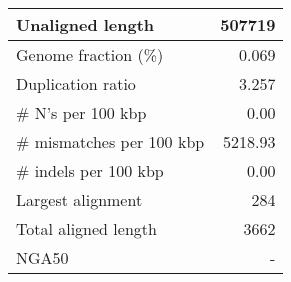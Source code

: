 \documentclass[12pt,a4paper]{article}
\begin{document}
\begin{table}[ht]
\begin{center}
\begin{tabular}{|l*{1}{|r}|}
Unaligned length & 507719 \\ \hline
Genome fraction (\%) & 0.069 \\ \hline
Duplication ratio & 3.257 \\ \hline
\# N's per 100 kbp & 0.00 \\ \hline
\# mismatches per 100 kbp & 5218.93 \\ \hline
\# indels per 100 kbp & 0.00 \\ \hline
Largest alignment & 284 \\ \hline
Total aligned length & 3662 \\ \hline
NGA50 & - \\ \hline
\end{tabular}
\end{center}
\end{table}
\end{document}
